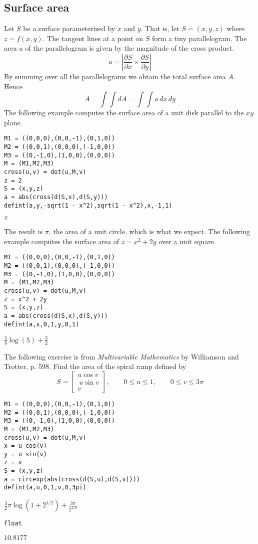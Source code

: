 
\subsection{Surface area}
Let $S$ be a surface parameterized by $x$ and $y$.
That is, let $S=(x,y,z)$ where $z=f(x,y)$.
The tangent lines at a point on $S$ form a tiny parallelogram.
The area $a$ of the parallelogram is given by the magnitude of the cross product.
$$a=\left|\frac{\partial S}{\partial x}\times\frac{\partial S}{\partial y}\right|$$
By summing over all the parallelograms we obtain the total surface area $A$.
Hence
$$A=\int\!\!\!\int dA=\int\!\!\!\int a\,dx\,dy$$
The following example computes the surface area of a unit disk
parallel to the $xy$ plane.

\begin{Verbatim}[formatcom=\color{blue},samepage=true]
M1 = ((0,0,0),(0,0,-1),(0,1,0))
M2 = ((0,0,1),(0,0,0),(-1,0,0))
M3 = ((0,-1,0),(1,0,0),(0,0,0))
M = (M1,M2,M3)
cross(u,v) = dot(u,M,v)
z = 2
S = (x,y,z)
a = abs(cross(d(S,x),d(S,y)))
defint(a,y,-sqrt(1 - x^2),sqrt(1 - x^2),x,-1,1)
\end{Verbatim}

\noindent
$\displaystyle \pi$

\bigskip
\noindent
The result is $\pi$, the area of a unit circle, which is what we expect.
The following example computes the surface area of $z=x^2+2y$ over
a unit square.

\begin{Verbatim}[formatcom=\color{blue},samepage=true]
M1 = ((0,0,0),(0,0,-1),(0,1,0))
M2 = ((0,0,1),(0,0,0),(-1,0,0))
M3 = ((0,-1,0),(1,0,0),(0,0,0))
M = (M1,M2,M3)
cross(u,v) = dot(u,M,v)
z = x^2 + 2y
S = (x,y,z)
a = abs(cross(d(S,x),d(S,y)))
defint(a,x,0,1,y,0,1)
\end{Verbatim}

\noindent
$\displaystyle \tfrac{5}{8}\log(5)+\tfrac{3}{2}$

\bigskip
\noindent
The following exercise is from
{\it Multivariable Mathematics} by Williamson and Trotter, p. 598.
Find the area of the spiral ramp defined by
$$S=\begin{bmatrix}u\cos v\\\ u\sin v\\ v\end{bmatrix},\qquad 0\le u\le1,\qquad 0\le v\le3\pi$$

\begin{Verbatim}[formatcom=\color{blue},samepage=true]
M1 = ((0,0,0),(0,0,-1),(0,1,0))
M2 = ((0,0,1),(0,0,0),(-1,0,0))
M3 = ((0,-1,0),(1,0,0),(0,0,0))
M = (M1,M2,M3)
cross(u,v) = dot(u,M,v)
x = u cos(v)
y = u sin(v)
z = v
S = (x,y,z)
a = circexp(abs(cross(d(S,u),d(S,v))))
defint(a,u,0,1,v,0,3pi)
\end{Verbatim}

\noindent
$\displaystyle \tfrac{3}{2}\pi\log(1+2^{1/2})+\frac{3\pi}{2^{1/2}}$

\begin{Verbatim}[formatcom=\color{blue},samepage=true]
float
\end{Verbatim}

\noindent
$\displaystyle 10.8177$
